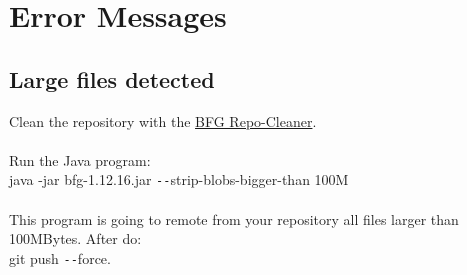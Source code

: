 \section{Error Messages}

\subsection{Large files detected}

Clean the repository with the \href{https://rtyley.github.io/bfg-repo-cleaner}{BFG Repo-Cleaner}.\\
\\
Run the Java program:\\

java -jar bfg-1.12.16.jar \texttt{-{}-}strip-blobs-bigger-than 100M\\
\\
This program is going to remote from your repository all files larger than 100MBytes. After do:\\

git push \texttt{-{}-}force.
